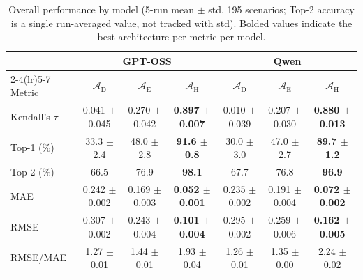 \documentclass[final,3p,times]{elsarticle}
\begin{document}
\begin{table}[htbp]
\begin{threeparttable}
\begin{tabular}{lcccccc}
\toprule
 & \multicolumn{3}{c}{GPT-OSS} & \multicolumn{3}{c}{Qwen} \\
\cmidrule(lr){2-4}\cmidrule(lr){5-7}
Metric & $\mathcal{A}_{\text{D}}$ & $\mathcal{A}_{\text{E}}$ & $\mathcal{A}_{\text{H}}$ & $\mathcal{A}_{\text{D}}$ & $\mathcal{A}_{\text{E}}$ & $\mathcal{A}_{\text{H}}$ \\
\midrule
Kendall's $\tau$ & 0.041 $\pm$ 0.045 & 0.270 $\pm$ 0.042 & \textbf{0.897 $\pm$ 0.007} & 0.010 $\pm$ 0.039 & 0.207 $\pm$ 0.030 & \textbf{0.880 $\pm$ 0.013} \\
Top-1 (\%) & 33.3 $\pm$ 2.4 & 48.0 $\pm$ 2.8 & \textbf{91.6 $\pm$ 0.8} & 30.0 $\pm$ 3.0 & 47.0 $\pm$ 2.7 & \textbf{89.7 $\pm$ 1.2} \\
Top-2 (\%) & 66.5 & 76.9 & \textbf{98.1} & 67.7 & 76.8 & \textbf{96.9} \\
MAE & 0.242 $\pm$ 0.002 & 0.169 $\pm$ 0.003 & \textbf{0.052 $\pm$ 0.001} & 0.235 $\pm$ 0.002 & 0.191 $\pm$ 0.004 & \textbf{0.072 $\pm$ 0.002} \\
RMSE & 0.307 $\pm$ 0.002 & 0.243 $\pm$ 0.004 & \textbf{0.101 $\pm$ 0.004} & 0.295 $\pm$ 0.002 & 0.259 $\pm$ 0.006 & \textbf{0.162 $\pm$ 0.005} \\
RMSE/MAE & 1.27 $\pm$ 0.01 & 1.44 $\pm$ 0.01 & 1.93 $\pm$ 0.04 & 1.26 $\pm$ 0.01 & 1.35 $\pm$ 0.00 & 2.24 $\pm$ 0.02 \\
\bottomrule
\end{tabular}
\renewcommand{\arraystretch}{1.0}
\caption{Overall performance by model (5-run mean $\pm$ std, 195 scenarios; Top-2 accuracy is a single run-averaged value, not tracked with std). Bolded values indicate the best architecture per metric per model.}
\label{tab:overall_by_model}
\label{tab:per_model_overall}
\end{threeparttable}
\end{table}
\end{document}
